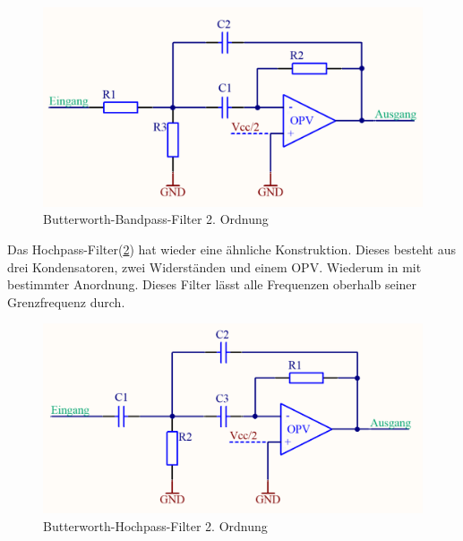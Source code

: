 \begin{figure} [H]
	\centering
	\includegraphics[width=1\textwidth]{img/Print4/BPFilter-Butterworth2Ordnung.PNG}
	\caption{Butterworth-Bandpass-Filter 2. Ordnung}
	\label {fig:8.4.1.2}
\end{figure}
Das Hochpass-Filter(\ref{fig:8.4.1.3}) hat wieder eine ähnliche Konstruktion.
Dieses besteht aus drei Kondensatoren, zwei Widerständen und einem OPV.
Wiederum in mit bestimmter Anordnung.
Dieses Filter lässt alle Frequenzen oberhalb seiner Grenzfrequenz durch.
\begin{figure} [H]
	\centering	
	\includegraphics[width=1\textwidth]{img/Print4/HPFilter-Butterworth2Ordnung.PNG}
	\caption{Butterworth-Hochpass-Filter 2. Ordnung}
	\label {fig:8.4.1.3}
\end{figure}


